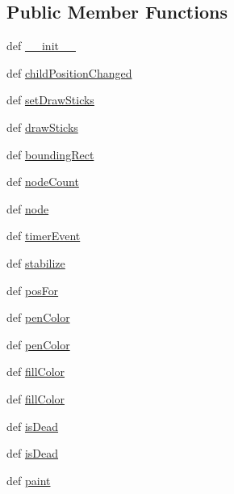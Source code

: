 \subsection*{Public Member Functions}
\begin{DoxyCompactItemize}
\item 
def \hyperlink{classstickman_1_1StickMan_acede34ae86b1ccc177a7a71e79fa5972}{\+\_\+\+\_\+init\+\_\+\+\_\+}
\item 
def \hyperlink{classstickman_1_1StickMan_a6936733a7c2f138b6abbbcb95018f41c}{child\+Position\+Changed}
\item 
def \hyperlink{classstickman_1_1StickMan_aa62fabdb0e854004e61f21db3009f06b}{set\+Draw\+Sticks}
\item 
def \hyperlink{classstickman_1_1StickMan_a6532b34b359dd537c2fff04ca0dd8a7b}{draw\+Sticks}
\item 
def \hyperlink{classstickman_1_1StickMan_a992b7ec84589786979232defa136fb6d}{bounding\+Rect}
\item 
def \hyperlink{classstickman_1_1StickMan_a5506dfc7487b6711973774210111324e}{node\+Count}
\item 
def \hyperlink{classstickman_1_1StickMan_adfd4c3f6573b5445d06f8aaba634b1ff}{node}
\item 
def \hyperlink{classstickman_1_1StickMan_a16f48b795cef7cb26401314c2aba5b6e}{timer\+Event}
\item 
def \hyperlink{classstickman_1_1StickMan_a773190ade6135780cb2a73c41060f0ef}{stabilize}
\item 
def \hyperlink{classstickman_1_1StickMan_a3f08501ccc753dfc07b765498a422606}{pos\+For}
\item 
def \hyperlink{classstickman_1_1StickMan_a7a1a88328f83cfa64206ac52665307dd}{pen\+Color}
\item 
def \hyperlink{classstickman_1_1StickMan_a7a1a88328f83cfa64206ac52665307dd}{pen\+Color}
\item 
def \hyperlink{classstickman_1_1StickMan_a4d6f25afdcf2c59c2fa65762a32a900e}{fill\+Color}
\item 
def \hyperlink{classstickman_1_1StickMan_a4d6f25afdcf2c59c2fa65762a32a900e}{fill\+Color}
\item 
def \hyperlink{classstickman_1_1StickMan_ad75442e627bff237c9e3296fa2256e5d}{is\+Dead}
\item 
def \hyperlink{classstickman_1_1StickMan_ad75442e627bff237c9e3296fa2256e5d}{is\+Dead}
\item 
def \hyperlink{classstickman_1_1StickMan_ae5386371b189e70bf913c32521f0d14c}{paint}
\end{DoxyCompactItemize}
